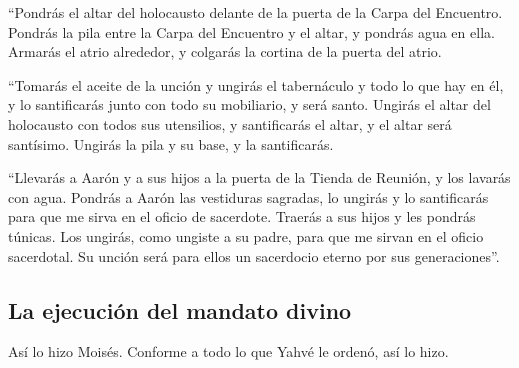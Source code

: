  ``Pondrás el altar del holocausto delante de la puerta de
la Carpa del Encuentro.  Pondrás la pila entre la Carpa
del Encuentro y el altar, y pondrás agua en ella.  Armarás
el atrio alrededor, y colgarás la cortina de la puerta del atrio.

 ``Tomarás el aceite de la unción y ungirás el tabernáculo
y todo lo que hay en él, y lo santificarás junto con todo su mobiliario,
y será santo.  Ungirás el altar del holocausto con todos
sus utensilios, y santificarás el altar, y el altar será santísimo.
 Ungirás la pila y su base, y la santificarás.

 ``Llevarás a Aarón y a sus hijos a la puerta de la
Tienda de Reunión, y los lavarás con agua.  Pondrás a
Aarón las vestiduras sagradas, lo ungirás y lo santificarás para que me
sirva en el oficio de sacerdote.  Traerás a sus hijos y
les pondrás túnicas.  Los ungirás, como ungiste a su
padre, para que me sirvan en el oficio sacerdotal. Su unción será para
ellos un sacerdocio eterno por sus generaciones''.

\hypertarget{la-ejecuciuxf3n-del-mandato-divino}{%
\subsection{La ejecución del mandato
divino}\label{la-ejecuciuxf3n-del-mandato-divino}}

 Así lo hizo Moisés. Conforme a todo lo que Yahvé le
ordenó, así lo hizo.


